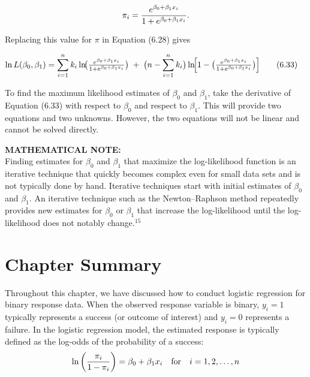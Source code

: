 \documentclass[
]{report}
\begin{document}
\[
\pi_i = \frac{e^{\beta_0 + \beta_1 x_i}}{1 + e^{\beta_0 + \beta_1 x_i}}.
\notag
\]

Replacing this value for \(\pi\) in Equation (6.28) gives

\begin{align}
\ln L(\beta_0, \beta_1)
&= \sum_{i=1}^n k_i \ln\!\bigl(\tfrac{e^{\beta_0 + \beta_1 x_i}}{1 + e^{\beta_0 + \beta_1 x_i}}\bigr)
\;+\;\bigl(n - \sum_{i=1}^n k_i\bigr)\ln\!\Bigl[1 - \bigl(\tfrac{e^{\beta_0 + \beta_1 x_i}}{1 + e^{\beta_0 + \beta_1 x_i}}\bigr)\Bigr]
\tag{6.33}
\end{align}

To find the maximum likelihood estimates of \(\beta_0\) and \(\beta_1\), take the derivative of Equation (6.33) with respect to \(\beta_0\) and respect to \(\beta_1\). This will provide two equations and two unknowns. However, the two equations will not be linear and cannot be solved directly.

\large

\textbf{MATHEMATICAL NOTE:}\\
Finding estimates for \(\beta_0\) and \(\beta_1\) that maximize the log-likelihood function is an iterative technique that quickly becomes complex even for small data sets and is not typically done by hand. Iterative techniques start with initial estimates of \(\beta_0\) and \(\beta_1\). An iterative technique such as the Newton--Raphson method repeatedly provides new estimates for \(\beta_0\) or \(\beta_1\) that increase the log-likelihood until the log-likelihood does not notably change.\(^{15}\)\\
\normalsize

\hypertarget{chapter-summary-5}{%
\section*{\texorpdfstring{\textbf{Chapter Summary}}{Chapter Summary}}\label{chapter-summary-5}}

Throughout this chapter, we have discussed how to conduct logistic regression for binary response data. When the observed response variable is binary, \(y_i = 1\) typically represents a success (or outcome of interest) and \(y_i = 0\) represents a failure. In the logistic regression model, the estimated response is typically defined as the log-odds of the probability of a success:
\begin{align}
\ln\left(\frac{\pi_i}{1-\pi_i}\right) = \beta_0 + \beta_1 x_i \quad \text{for} \quad i = 1, 2, \ldots, n
\notag
\end{align}
\end{document}
